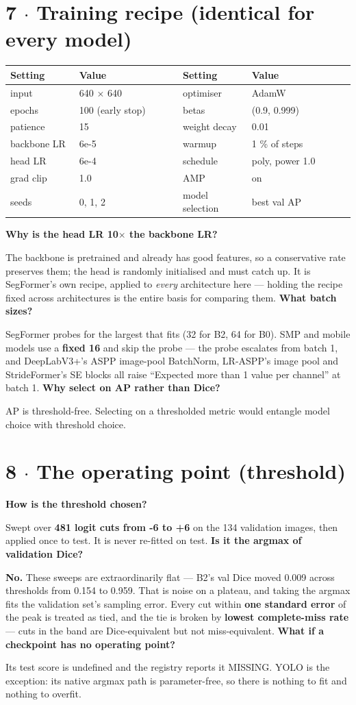 \documentclass[10pt,a4paper]{article}
\newcommand{\qq}[1]{\medskip\noindent\textbf{\color{navy}#1}\par\nobreak}
\begin{document}
\section*{7 $\cdot$ Training recipe (identical for every model)}
\begin{center}\small\begin{tabular}{p{0.2\linewidth}p{0.3\linewidth}p{0.2\linewidth}p{0.3\linewidth}}
\toprule
\textbf{Setting} & \textbf{Value} & \textbf{Setting} & \textbf{Value} \\
\midrule
input & 640 $\times$ 640 & optimiser & AdamW \\
epochs & 100 (early stop) & betas & (0.9, 0.999) \\
patience & 15 & weight decay & 0.01 \\
backbone LR & 6e-5 & warmup & 1 \% of steps \\
head LR & 6e-4 & schedule & poly, power 1.0 \\
grad clip & 1.0 & AMP & on \\
seeds & 0, 1, 2 & model selection & best val AP \\
\bottomrule\end{tabular}\end{center}
\qq{Why is the head LR 10$\times$ the backbone LR?}
The backbone is pretrained and already has good features, so a conservative rate preserves them; the head is randomly initialised and must catch up. It is SegFormer's own recipe, applied to \textit{every} architecture here — holding the recipe fixed across architectures is the entire basis for comparing them.
\qq{What batch sizes?}
SegFormer probes for the largest that fits (32 for B2, 64 for B0). SMP and mobile models use a \textbf{fixed 16} and skip the probe — the probe escalates from batch 1, and DeepLabV3+'s ASPP image-pool BatchNorm, LR-ASPP's image pool and StrideFormer's SE blocks all raise ``Expected more than 1 value per channel'' at batch 1.
\qq{Why select on AP rather than Dice?}
AP is threshold-free. Selecting on a thresholded metric would entangle model choice with threshold choice.
\section*{8 $\cdot$ The operating point (threshold)}
\qq{How is the threshold chosen?}
Swept over \textbf{481 logit cuts from -6 to +6} on the 134 validation images, then applied once to test. It is never re-fitted on test.
\qq{Is it the argmax of validation Dice?}
\textbf{No.} These sweeps are extraordinarily flat — B2's val Dice moved 0.009 across thresholds from 0.154 to 0.959. That is noise on a plateau, and taking the argmax fits the validation set's sampling error. Every cut within \textbf{one standard error} of the peak is treated as tied, and the tie is broken by \textbf{lowest complete-miss rate} — cuts in the band are Dice-equivalent but not miss-equivalent.
\qq{What if a checkpoint has no operating point?}
Its test score is undefined and the registry reports it MISSING. YOLO is the exception: its native argmax path is parameter-free, so there is nothing to fit and nothing to overfit.
\end{document}
